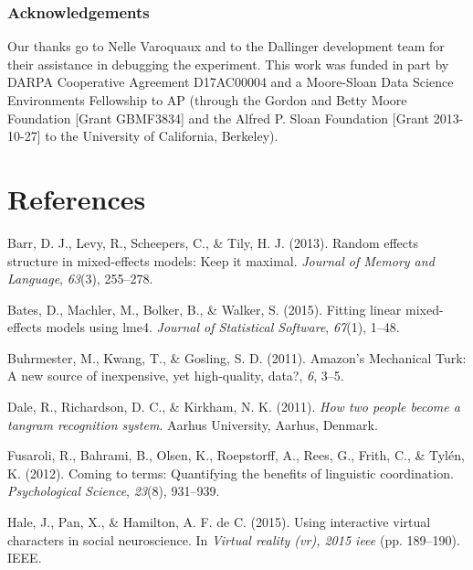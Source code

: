 \documentclass[10pt, letterpaper]{article}
\begin{document}
\subsubsection{Acknowledgements}\label{acknowledgements}

Our thanks go to Nelle Varoquaux and to the Dallinger development team
for their assistance in debugging the experiment. This work was funded
in part by DARPA Cooperative Agreement D17AC00004 and a Moore-Sloan Data
Science Environments Fellowship to AP (through the Gordon and Betty
Moore Foundation {[}Grant GBMF3834{]} and the Alfred P. Sloan Foundation
{[}Grant 2013-10-27{]} to the University of California, Berkeley).

\section{References}\label{references}

\setlength{\parindent}{-0.1in} \setlength{\leftskip}{0.125in} \noindent

\hypertarget{refs}{}
\hypertarget{ref-barr2013random}{}
Barr, D. J., Levy, R., Scheepers, C., \& Tily, H. J. (2013). Random
effects structure in mixed-effects models: Keep it maximal.
\emph{Journal of Memory and Language}, \emph{63}(3), 255--278.

\hypertarget{ref-bates2015fitting}{}
Bates, D., Machler, M., Bolker, B., \& Walker, S. (2015). Fitting linear
mixed-effects models using lme4. \emph{Journal of Statistical Software},
\emph{67}(1), 1--48.

\hypertarget{ref-buhrmester2011amazon}{}
Buhrmester, M., Kwang, T., \& Gosling, S. D. (2011). Amazon's Mechanical
Turk: A new source of inexpensive, yet high-quality, data?, \emph{6},
3--5.

\hypertarget{ref-dale2011how}{}
Dale, R., Richardson, D. C., \& Kirkham, N. K. (2011). \emph{How two
people become a tangram recognition system}. Aarhus University, Aarhus,
Denmark.

\hypertarget{ref-fusaroli2012coming}{}
Fusaroli, R., Bahrami, B., Olsen, K., Roepstorff, A., Rees, G., Frith,
C., \& Tylén, K. (2012). Coming to terms: Quantifying the benefits of
linguistic coordination. \emph{Psychological Science}, \emph{23}(8),
931--939.

\hypertarget{ref-hale2015using}{}
Hale, J., Pan, X., \& Hamilton, A. F. de C. (2015). Using interactive
virtual characters in social neuroscience. In \emph{Virtual reality
(vr), 2015 ieee} (pp. 189--190). IEEE.
\end{document}
